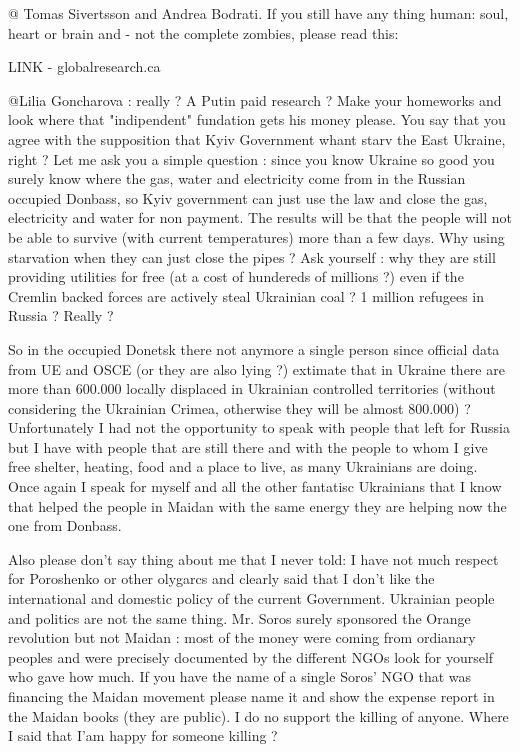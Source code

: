 \begin{itemize}
\begin{itemize}

@ Tomas Sivertsson and Andrea Bodrati. If you still have any thing human: soul,
heart or brain and - not the complete zombies, please read this: 

LINK - globalresearch.ca


@Lilia Goncharova : really ? A Putin paid research ? Make your homeworks and
look where that "indipendent" fundation gets his money please. You say that you
agree with the supposition that Kyiv Government whant starv the East Ukraine,
right ? Let me ask you a simple question : since you know Ukraine so good you
surely know where the gas, water and electricity come from in the Russian
occupied Donbass, so Kyiv government can just use the law and close the gas,
electricity and water for non payment. The results will be that the people will
not be able to survive (with current temperatures) more than a few days. Why
using starvation when they can just close the pipes ? Ask yourself : why they
are still providing utilities for free (at a cost of hundereds of millions ?)
even if the Cremlin backed forces are actively steal Ukrainian coal ? 1 million
refugees in Russia ? Really ? 

So in the occupied Donetsk there not anymore a single person since official
data from UE and OSCE (or they are also lying ?) extimate that in Ukraine there
are more than 600.000 locally displaced in Ukrainian controlled territories
(without considering the Ukrainian Crimea, otherwise they will be almost
800.000) ? Unfortunately I had not the opportunity to speak with people that
left for Russia but I have with people that are still there and with the people
to whom I give free shelter, heating, food and a place to live, as many
Ukrainians are doing. Once again I speak for myself and all the other fantatisc
Ukrainians that I know that helped the people in Maidan with the same energy
they are helping now the one from Donbass. 

Also please don't say thing about me that I never told: I have not much respect
for Poroshenko or other olygarcs and clearly said that I don't like the
international and domestic policy of the current Government. Ukrainian people
and politics are not the same thing. Mr. Soros surely sponsored the Orange
revolution but not Maidan : most of the money were coming from ordianary
peoples and were precisely documented by the different NGOs look for yourself
who gave how much. If you have the name of a single Soros' NGO that was
financing the Maidan movement please name it and show the expense report in the
Maidan books (they are public). I do no support the killing of anyone. Where I
said that I'am happy for someone killing ? 


\end{itemize}
\end{itemize}
